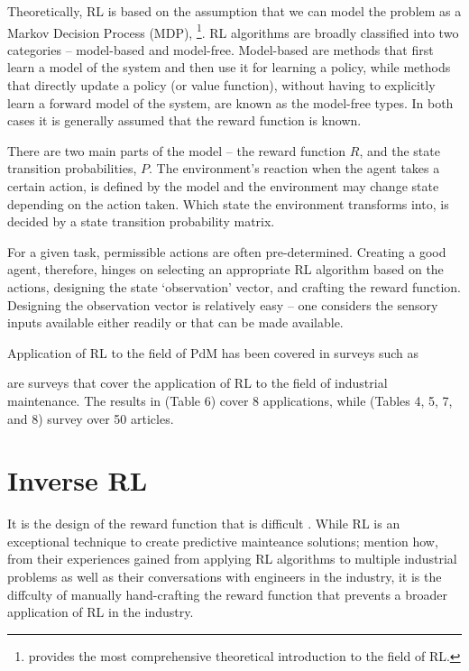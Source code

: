 \documentclass{article}
\begin{document}
	Theoretically, RL is based on the assumption that we can model the problem as a Markov Decision Process (MDP), \citep{sutton2018}\footnote{\citet{sutton2018} provides the most comprehensive theoretical introduction to the field of RL.}. 
	RL algorithms are broadly classified into two categories -- model-based and model-free. Model-based are methods that first learn a model of the system and then use it for learning a policy, while methods that directly update a policy (or value function), without having to explicitly learn a forward model of the system, are known as the model-free types. In both cases it is generally assumed that the reward function is known.
	
	There are two main parts of the model -- the reward function $R$, and the state transition probabilities, $P$. The environment's reaction when the agent takes a certain action, is defined by the model and the environment may change state depending on the action taken. Which state the environment transforms into, is decided by a state transition probability matrix. 
	
	For a given task, permissible actions are often pre-determined. Creating a good agent, therefore, hinges on selecting an appropriate RL algorithm based on the actions, designing the state `observation' vector, and crafting the reward function. Designing the observation vector is relatively easy -- one considers the sensory inputs available either readily or that can be made available. 
	
	Application of RL to the field of PdM has been covered in surveys such as \cite{Erhan2021Smart, Ren2021, Barja-Martinez2021, panzer2022, siraskar2023}
	
	\cite{panzer2022, siraskar2023} are surveys that cover the application of RL to the field of industrial maintenance. The results in \cite{panzer2022} (Table 6) cover 8 applications, while \cite{siraskar2023} (Tables 4, 5, 7, and 8) survey over 50 articles. 
	
	\section{Inverse RL}
	
	It is the design of the reward function that is difficult \citep{abbeel2004apprenticeship, ng2000algorithms}.
	While RL is an exceptional technique to create predictive mainteance solutions; \cite{abbeel2004apprenticeship} mention how, from their experiences gained from applying RL algorithms to multiple industrial problems as well as their conversations with engineers in the industry, it is the diffculty of manually hand-crafting the reward function that prevents a broader application of RL in the industry.
	
\end{document}
